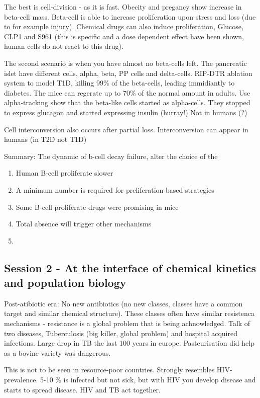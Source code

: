 \documentclass[12p]{article}
\begin{document}
The best is cell-division - as it is fast.
Obecity and pregancy show increase in beta-cell mass.
Beta-cell is able to increase proliferation upon stress and loss (due to for example injury).
Chemical drugs can also induce proliferation, Glucose, CLP1 and S961 (this is specific and a dose dependent effect have been shown, human cells do not react to this drug).

The second scenario is when you have almost no beta-cells left.
The pancreatic islet have different cells, alpha, beta, PP cells and delta-cells.
RIP-DTR ablation system to model T1D, killing 99\% of the beta-cells, leading immidiantly to diabetes. 
The mice can regerate up to 70\% of the normal amount in adults.
Use alpha-tracking show that the beta-like cells started as alpha-cells. 
They stopped to express glucagon and started expressing insulin (hurray!)
Not in humans (?)

Cell interconversion also occurs after partial loss.
Interconversion can appear in humans (in T2D not T1D)

Summary: The dynamic of b-cell decay failure, alter the choice of the 

\begin{enumerate}
    \item
	Human B-cell proliferate slower
    \item
	A minimum number is required for preliferation based strategies
    \item
	Some B-cell proliferate drugs were promising in mice 
    \item
	Total absence will trigger other mechanisms
    \item
\end{enumerate}


\subsection*{Session 2 - At the interface of chemical kinetics and population biology}

Post-atibiotic era: No new antibiotics (no new classes, classes have a common target and similar chemical structure).
These classes often have similar resistenca mechanisms - resistance is a global problem that is being achnowledged.
Talk of two diseases, Tuberculosis (big killer, global problem) and hospital acquired infections.
Large drop in TB the last 100 years in europe.
Pasteurisation did help as a bovine variety was dangerous.

This is not to be seen in resource-poor countries. 
Strongly resembles HIV-prevalence. 
5-10 \% is infected but not sick, but with HIV you develop disease and starts to spread disease.
HIV and TB act together.
\end{document}
